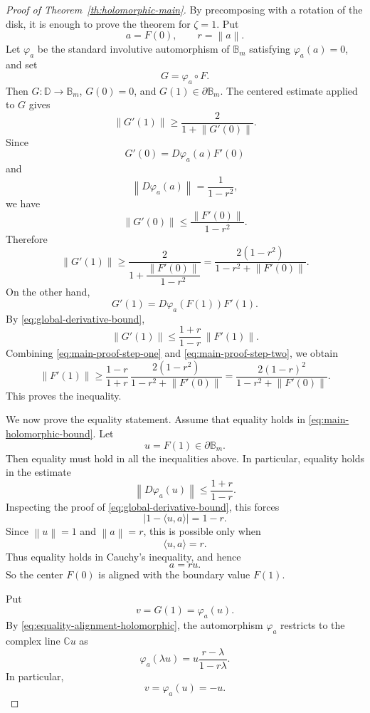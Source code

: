 \documentclass[11pt]{amsart}
\theoremstyle{definition}
\theoremstyle{remark}
\newcommand{\C}{\mathbb C}
\newcommand{\D}{\mathbb D}
\newcommand{\B}{\mathbb B}
\newcommand{\inner}[2]{\langle #1,#2\rangle}
\newcommand{\norm}[1]{\left\|#1\right\|}
\begin{document}
\begin{proof}[Proof of Theorem~\ref{th:holomorphic-main}]
By precomposing with a rotation of the disk, it is enough to prove the theorem for \(\zeta=1\). Put
\[
        a=F(0),
        \qquad
        r=\norm{a}.
\]
Let \(\varphi_a\) be the standard involutive automorphism of \(\B_m\) satisfying \(\varphi_a(a)=0\), and set
\[
        G=\varphi_a\circ F.
\]
Then \(G:\D\to\B_m\), \(G(0)=0\), and \(G(1)\in\partial\B_m\). The centered estimate applied to \(G\) gives
\[
        \norm{G'(1)}\ge \frac{2}{1+\norm{G'(0)}}.
\]
Since
\[
        G'(0)=D\varphi_a(a)F'(0)
\]
and
\[
        \norm{D\varphi_a(a)}=\frac1{1-r^2},
\]
we have
\[
        \norm{G'(0)}\le \frac{\norm{F'(0)}}{1-r^2}.
\]
Therefore
\begin{equation}\label{eq:main-proof-step-one}
        \norm{G'(1)}
        \ge
        \frac{2}{1+\dfrac{\norm{F'(0)}}{1-r^2}}
        =
        \frac{2(1-r^2)}{1-r^2+\norm{F'(0)}}.
\end{equation}
On the other hand,
\[
        G'(1)=D\varphi_a(F(1))F'(1).
\]
By \eqref{eq:global-derivative-bound},
\begin{equation}\label{eq:main-proof-step-two}
        \norm{G'(1)}
        \le
        \frac{1+r}{1-r}\,\norm{F'(1)}.
\end{equation}
Combining \eqref{eq:main-proof-step-one} and \eqref{eq:main-proof-step-two}, we obtain
\[
        \norm{F'(1)}
        \ge
        \frac{1-r}{1+r}\,
        \frac{2(1-r^2)}{1-r^2+\norm{F'(0)}}
        =
        \frac{2(1-r)^2}{1-r^2+\norm{F'(0)}}.
\]
This proves the inequality.

We now prove the equality statement. Assume that equality holds in \eqref{eq:main-holomorphic-bound}. Let
\[
        u=F(1)\in\partial\B_m.
\]
Then equality must hold in all the inequalities above. In particular, equality holds in the estimate
\[
        \norm{D\varphi_a(u)}\le \frac{1+r}{1-r}.
\]
Inspecting the proof of \eqref{eq:global-derivative-bound}, this forces
\[
        |1-\inner{u}{a}|=1-r.
\]
Since \(\norm{u}=1\) and \(\norm{a}=r\), this is possible only when
\[
        \inner{u}{a}=r.
\]
Thus equality holds in Cauchy's inequality, and hence
\begin{equation}\label{eq:equality-alignment-holomorphic}
        a=ru.
\end{equation}
So the center \(F(0)\) is aligned with the boundary value \(F(1)\).

Put
\[
        v=G(1)=\varphi_a(u).
\]
By \eqref{eq:equality-alignment-holomorphic}, the automorphism \(\varphi_a\) restricts to the complex line \(\C u\) as
\[
        \varphi_a(\lambda u)=u\frac{r-\lambda}{1-r\lambda}.
\]
In particular,
\begin{equation}\label{eq:v-minus-u}
        v=\varphi_a(u)=-u.
\end{equation}


\end{proof}
\end{document}
